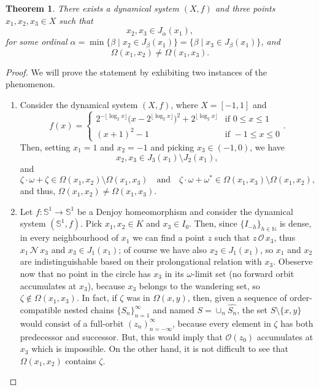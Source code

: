 \documentclass[10pt,a4paper]{article}
\theoremstyle{definition}
\theoremstyle{remark}
\theoremstyle{plain}
\newtheorem{thm}[defi]{Theorem}
\begin{document}
 \begin{thm}\label{denjo_}
     There exists a dynamical system $(X,f)$ and three points $x_1,x_2,x_3\in X$ such that
    $$x_2,x_3\in J_\alpha(x_1),$$
     for some ordinal $\alpha=\min\{\beta\mid x_2\in J_\beta(x_1)\}=\{\beta\mid x_3\in J_\beta(x_1)\}$, and
     $$\Omega(x_1,x_2)\neq\Omega(x_1,x_3).$$


 \end{thm}
 \begin{proof}
     We will prove the statement by exhibiting two instances of the phenomenon. 
     \begin{enumerate}
        \item Consider the
        dynamical system $(X,f)$, where $X=[-1,1]$ and
        $$
        f(x)=
        \begin{cases}
            2^{-\lfloor \log_2 x \rfloor}\bigl(x-2^{\lfloor \log_2 x \rfloor}\bigr)^2+2^{\lfloor \log_2 x \rfloor} &\text{if }0\le x\le1\\
            (x+1)^2-1&\text{if }-1\le x\le0
        \end{cases}.
        $$
        Then, setting $x_1=1$ and $x_2=-1$ and picking $x_3\in(-1,0)$, we have
        $$x_2,x_3\in J_3(x_1)\setminus J_2(x_1),$$
        and
        $$\zeta\cdot\omega+\zeta\in\Omega(x_1,x_2)\setminus\Omega(x_1,x_3)\quad\text{and}\quad\zeta\cdot\omega+\omega^*\in\Omega(x_1,x_3)\setminus\Omega(x_1,x_2),$$
        and thus, $\Omega(x_1,x_2)\neq\Omega(x_1,x_3)$.

        \item Let $f:\mathbb S^1\to\mathbb S^1$ be a Denjoy homeomorphism and consider the dynamical system $(\mathbb S^1,f)$. Pick $x_1,x_2\in K$ and $x_3\in I_0$. 
        Then, since $\{I_{-h}\}_{h\in \mathbb{N}}$ is dense, in every neighbourhood of $x_1$ we can find a point $z$ such that $z\,\mathcal{O}\,x_3$, thus $x_1\,\mathcal{N}\,x_3$ and $x_3\in J_1(x_1)$; of course we have also $x_2\in J_1(x_1)$, so $x_1$ and $x_2$ are indistinguishable based on their prolongational relation with $x_3$. Obeserve now that no point in the circle has $x_3$ in its $\omega$-limit set (no forward orbit accumulates at $x_3$), because $x_3$ belongs to the wandering set, so $\zeta\notin \Omega(x_1,x_3)$. In fact, if $\zeta$ was in $\Omega(x,y)$, then, given a sequence of order-compatible nested chains $\{S_n\}_{n=1}^\infty$ and named $S=\cup_n\widehat{S_n}$, the set $S\setminus\{x,y\}$ would consist of a full-orbit $(z_n)_{n=-\infty}^\infty$, because every element in $\zeta$ has both predecessor and successor. But, this would imply that $\mathcal{O}(z_0)$ accumulates at $x_3$ which is impossible.
        On the other hand, it is not difficult to see that $\Omega(x_1,x_2)$ contains $\zeta$.
    \end{enumerate}
    
\end{proof}
\end{document}
